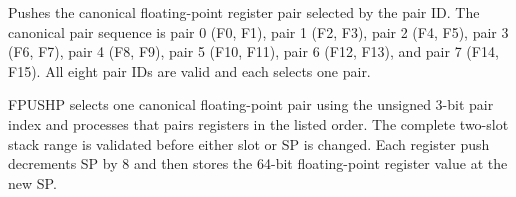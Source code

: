 Pushes the canonical floating-point register pair selected by the pair ID. The canonical pair sequence is pair 0 (F0, F1), pair 1 (F2, F3), pair 2 (F4, F5), pair 3 (F6, F7), pair 4 (F8, F9), pair 5 (F10, F11), pair 6 (F12, F13), and pair 7 (F14, F15). All eight pair IDs are valid and each selects one pair.

FPUSHP selects one canonical floating-point pair using the unsigned 3-bit pair index and processes that pair\textquotesingle{}s registers in the listed order. The complete two-slot stack range is validated before either slot or SP is changed. Each register push decrements SP by 8 and then stores the 64-bit floating-point register value at the new SP.
